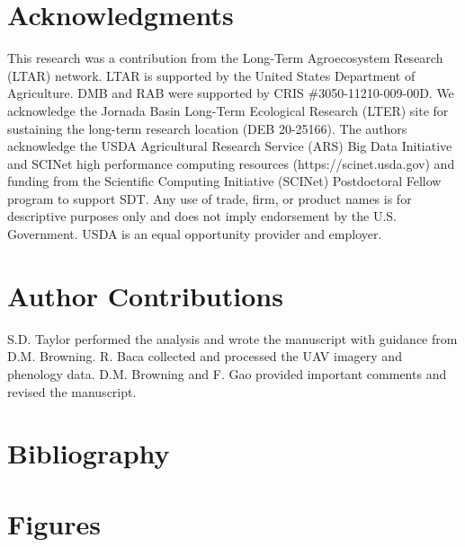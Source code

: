 \documentclass{article}
\begin{document}
\section*{Acknowledgments}
This research was a contribution from the Long-Term Agroecosystem Research (LTAR) network. LTAR is supported by the United States Department of Agriculture. DMB and RAB were supported by CRIS \#3050-11210-009-00D. We acknowledge the Jornada Basin Long-Term Ecological Research (LTER) site for sustaining the long-term research location (DEB 20-25166). The authors acknowledge the USDA Agricultural Research Service (ARS) Big Data Initiative and SCINet high performance computing resources (https://scinet.usda.gov) and funding from the Scientific Computing Initiative (SCINet) Postdoctoral Fellow program to support SDT. Any use of trade, firm, or product names is for descriptive purposes only and does not imply endorsement by the U.S. Government. USDA is an equal opportunity provider and employer.


\section*{Author Contributions} 
S.D. Taylor performed the analysis and wrote the manuscript with guidance from D.M. Browning. R. Baca collected and processed the UAV imagery and phenology data. D.M. Browning and F. Gao provided important comments and revised the manuscript.


\section{Bibliography}
\printbibliography

\section*{Figures}

\end{document}
